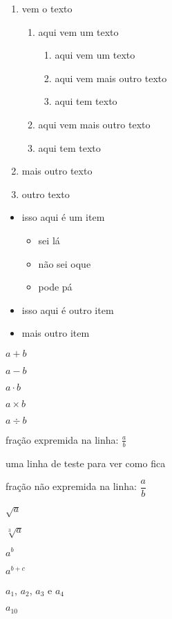 \documentclass[a4paper, 12pt]{article}
\begin{document}
\begin{enumerate} %
    \item vem o texto
    
    \begin{enumerate} %
        \item aqui vem um texto
    
        \begin{enumerate}
            \item aqui vem um texto
            \item aqui vem mais outro texto
            \item aqui tem texto
        \end{enumerate}
        
        \item aqui vem mais outro texto
        \item aqui tem texto
    \end{enumerate}
    
    \item mais outro texto
    \item outro texto
\end{enumerate}

\begin{itemize} %
        \item isso aqui é um item
        
        \begin{itemize} %
            \item sei lá
            \item não sei oque
            \item pode pá
        \end{itemize}
        
        \item isso aqui é outro item
        \item mais outro item
\end{itemize}

$a+b$ %

$a-b$ %

$a \cdot b$ %

$a \times b$ %

$a \div b$ %

fração expremida na linha: $\frac{a}{b}$ %

uma linha de teste para ver como fica

fração não expremida na linha: $\dfrac{a}{b}$ %

$\sqrt{a}$ %

$\sqrt[3]{a}$ %

$a^b$ %

$a^{b+c}$ %

$a_1$, $a_2$, $a_3$ e $a_4$ %

$a_{10}$ %
\end{document}
